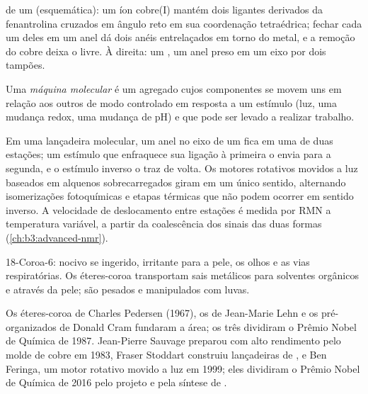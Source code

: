 \begin{omfigure}
{\small {} de um  (esquemática): um íon cobre(I) mantém dois
ligantes derivados da fenantrolina cruzados em ângulo reto em sua coordenação
tetraédrica; fechar cada um deles em um anel dá dois anéis entrelaçados em torno do
metal, e a remoção do cobre deixa o  livre. À direita: um , um
anel preso em um eixo por dois tampões.}
\end{omfigure}

\begin{definition}\label{def:b3:supramolecular:machine}
Uma \emph{máquina molecular} é um agregado cujos
componentes se movem uns em relação aos outros de modo controlado em resposta a um
estímulo (luz, uma mudança redox, uma mudança de pH) e que pode ser levado a realizar trabalho.
\end{definition}

Em uma lançadeira molecular, um anel no eixo de um  fica em uma de duas estações; um
estímulo que enfraquece sua ligação à primeira o envia para a segunda, e o
estímulo inverso o traz de volta. Os motores rotativos movidos a luz baseados em
alquenos sobrecarregados giram em um único sentido, alternando isomerizações
fotoquímicas e etapas térmicas que não podem ocorrer em sentido inverso. A velocidade de
deslocamento entre estações é medida por RMN a temperatura variável, a partir da
coalescência dos sinais das duas formas (\cref{ch:b3:advanced-nmr}).

\begin{safety}{}
18-Coroa-6: nocivo se ingerido, irritante para a pele, os olhos e as vias respiratórias.
Os éteres-coroa transportam sais metálicos para solventes orgânicos e através da pele; são
pesados e manipulados com luvas.
\end{safety}

\begin{history}
Os éteres-coroa de Charles Pedersen (1967), os  de Jean-Marie Lehn e os 
pré-organizados de Donald Cram fundaram a área; os três dividiram o Prêmio Nobel de
Química de 1987. Jean-Pierre Sauvage preparou  com alto rendimento pelo
molde de cobre em 1983, Fraser Stoddart construiu lançadeiras de , e Ben
Feringa, um motor rotativo movido a luz em 1999; eles dividiram o Prêmio Nobel de
Química de 2016 pelo projeto e pela síntese de .
\end{history}

